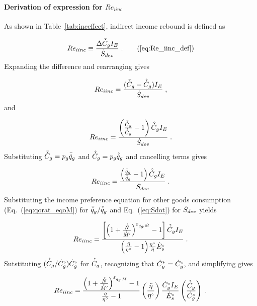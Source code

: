 \paragraph{Derivation of expression for $Re_{iinc}$}
\label{sec:Re_iinc}

As shown in Table~\ref{tab:inceffect}, indirect income rebound is defined as

\begin{equation}
  Re_{iinc} \equiv \frac{\Delta \rainc{C}_g I_E}{\Sdot} \; . \tag{\ref{eq:Re_iinc_def}}
\end{equation}
%
Expanding the difference and rearranging gives

\begin{equation}
  Re_{iinc} = \frac{(\bar{\dot{C}}_g - \hat{\dot{C}}_g) I_E}{\dot{S}_{dev}} \; , 
\end{equation}
%
and

\begin{equation}
  Re_{iinc} = \frac{\left( \frac{\bar{\dot{C}}_g}{\hat{\dot{C}}_g} - 1  \right) \hat{\dot{C}}_g I_E}{\dot{S}_{dev}} \; .
\end{equation}
%
Substituting $\bar{\dot{C}}_g = p_g \bar{\dot{q}}_g$ and $\hat{\dot{C}}_g = p_g \hat{\dot{q}}_g$ and
cancelling terms gives

\begin{equation}
  Re_{iinc} = \frac{\left( \frac{\bar{\dot{q}}_g}{\hat{\dot{q}}_g} - 1  \right) \hat{\dot{C}}_g I_E}{\dot{S}_{dev}} \; .
\end{equation}
%
Substituting the income preference equation for other goods consumption (Eq.~(\ref{eq:qorat_eqoM}) 
for $\bar{\dot{q}}_g / \hat{\dot{q}}_g$
and Eq.~(\ref{eq:Sdot}) for $\dot{S}_{dev}$ yields

\begin{equation}
  Re_{iinc} = \frac{\left[ \left( 1 + \frac{\hat{\dot{N}}}{\hat{\dot{M}}^\prime} \right)^{\varepsilon_{\dot{q}_g\!,\dot{M}}} - 1  \right] 
              \hat{\dot{C}}_g I_E}{\left( \frac{\tilde{\eta}}{{}{\eta}^{\scriptscriptstyle \circ}} - 1 \right)\! \frac{{}{\eta}^{\scriptscriptstyle \circ}}{\tilde{\eta}} {}{\dot{E}}^{\scriptscriptstyle \circ}_s} \; .
\end{equation}
%
Sutstituting $(\hat{\dot{C}}_g/{}{\dot{C}}^{\scriptscriptstyle \circ}_g) {}{\dot{C}}^{\scriptscriptstyle \circ}_g$ for $\hat{\dot{C}}_g$,  
recognizing that ${\dot{C}}^*_g = {}{\dot{C}}^{\scriptscriptstyle \circ}_g$, and simplifying gives 

\begin{equation}
  Re_{iinc} = \frac{\left( 1 + \frac{\hat{\dot{N}}}{\hat{\dot{M}}^\prime} \right)^{\varepsilon_{\dot{q}_g\!,\dot{M}}} - 1}{\frac{\tilde{\eta}}{{}{\eta}^{\scriptscriptstyle \circ}} - 1} 
              \left( \frac{\tilde{\eta}}{{}{\eta}^{\scriptscriptstyle \circ}} \right)
              \frac{{}{\dot{C}}^{\scriptscriptstyle \circ}_g I_E}{{}{\dot{E}}^{\scriptscriptstyle \circ}_s}
              \left( \frac{\hat{\dot{C}}_g}{{}{\dot{C}}^{\scriptscriptstyle \circ}_g} \right) \; .
\end{equation}

